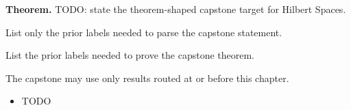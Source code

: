 \label{cap:hilbert-spaces}

\begin{tcolorbox}[
  colback=gray!6,
  colframe=gray!40,
  arc=2pt,
  left=8pt, right=8pt, top=6pt, bottom=6pt,
  title={\small\textbf{Capstone Theorem}},
  fonttitle=\small\bfseries
]
\textbf{Theorem.}
TODO: state the theorem-shaped capstone target for Hilbert Spaces.
\end{tcolorbox}

\begin{remark*}
List only the prior labels needed to parse the capstone statement.
\end{remark*}

\begin{remark*}
List the prior labels needed to prove the capstone theorem.
\end{remark*}

\begin{remark*}
The capstone may use only results routed at or before this chapter.
\end{remark*}

\begin{dependencies}
\begin{itemize}
  \item TODO
\end{itemize}
\end{dependencies}

\clearpage
